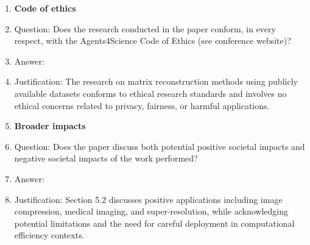 \documentclass{article}
\begin{document}
\begin{enumerate}
\item {\bf Code of ethics}
    \item[] Question: Does the research conducted in the paper conform, in every respect, with the Agents4Science Code of Ethics (see conference website)?
    \item[] Answer: \answerYes{}
    \item[] Justification: The research on matrix reconstruction methods using publicly available datasets conforms to ethical research standards and involves no ethical concerns related to privacy, fairness, or harmful applications.

\item {\bf Broader impacts}
    \item[] Question: Does the paper discuss both potential positive societal impacts and negative societal impacts of the work performed?
    \item[] Answer: \answerYes{}
    \item[] Justification: Section 5.2 discusses positive applications including image compression, medical imaging, and super-resolution, while acknowledging potential limitations and the need for careful deployment in computational efficiency contexts.

\end{enumerate}
\end{document}
